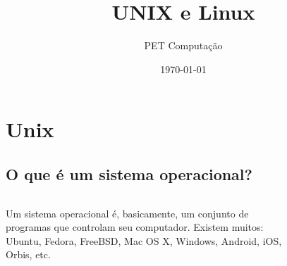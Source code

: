 \documentclass{beamer}
\title{UNIX e Linux}
\author{PET Computação}
\institute{Universidade Federal de Santa Catarina}
\date{\today}
\begin{document}
\maketitle

\section{Unix}

\subsection{O que é um sistema operacional?}

\begin{frame}
	
	\begin{columns}

		Um sistema operacional é, basicamente, um conjunto de programas que controlam
		seu computador.
		\newline
		\newline
		Existem muitos: Ubuntu, Fedora, FreeBSD, Mac OS X, Windows, Android, iOS, Orbis, etc.


		\begin{figure}
    \end{figure}


\end{columns}
\end{frame}
\end{document}
